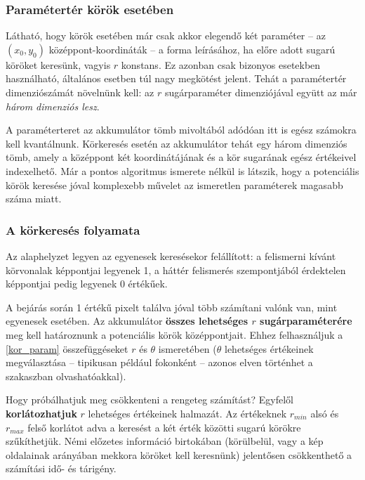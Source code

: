 \subsubsection{Paramétertér körök esetében}\label{sect:korok_parameterter}

Látható, hogy körök esetében már csak akkor elegendő két paraméter -- az $ (x_{0}, y_{0}) $ középpont-koordináták -- a forma leírásához, ha előre adott sugarú köröket keresünk, vagyis $ r $ konstans. Ez azonban csak bizonyos esetekben használható, általános esetben túl nagy megkötést jelent. Tehát a paramétertér dimenziószámát növelnünk kell: az $ r $ sugárparaméter dimenziójával együtt az már \emph{három dimenziós lesz}.

A paraméterteret az akkumulátor tömb mivoltából adódóan itt is egész számokra kell kvantálnunk. Körkeresés esetén az akkumulátor tehát egy három dimenziós tömb, amely a középpont két koordinátájának és a kör sugarának egész értékeivel indexelhető. Már a pontos algoritmus ismerete nélkül is látszik, hogy a potenciális körök keresése jóval komplexebb művelet az ismeretlen paraméterek magasabb száma miatt.

\subsubsection{A körkeresés folyamata}\label{sect:korok_keresese}

Az alaphelyzet legyen az egyenesek keresésekor felállított: a felismerni kívánt körvonalak képpontjai legyenek 1, a háttér felismerés szempontjából érdektelen képpontjai pedig legyenek 0 értékűek.

A bejárás során 1 értékű pixelt találva jóval több számítani valónk van, mint egyenesek esetében. Az akkumulátor \textbf{összes lehetséges $ r $ sugárparaméterére} meg kell határoznunk a potenciális körök középpontjait. Ehhez felhasználjuk a \eqref{kor_param} összefüggéseket $ r $ és $ \theta $ ismeretében ($ \theta $ lehetséges értékeinek megválasztása -- tipikusan például fokonként -- azonos elven történhet a  szakaszban olvashatóakkal).

Hogy próbálhatjuk meg csökkenteni a rengeteg számítást? Egyfelől \textbf{korlátozhatjuk} $ r $ lehetséges értékeinek halmazát. Az értékeknek $ r_{min} $ alsó és $ r_{max} $ felső korlátot adva a keresést a két érték közötti sugarú körökre szűkíthetjük. Némi előzetes információ birtokában (körülbelül, vagy a kép oldalainak arányában mekkora köröket kell keresnünk) jelentősen csökkenthető a számítási idő- és tárigény.

